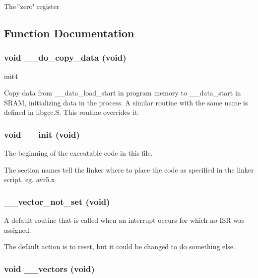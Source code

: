 The \char`\"{}zero\char`\"{} register 

\subsection{Function Documentation}
\subsubsection{\setlength{\rightskip}{0pt plus 5cm}void \_\-\_\-do\_\-copy\_\-data (void)}\label{crt0_8c_ab2f2df3d3b1d20c55234f883bbcb9a3}


init4 

Copy data from \_\-\_\-data\_\-load\_\-start in program memory to \_\-\_\-data\_\-start in SRAM, initializing data in the process. A similar routine with the same name is defined in libgcc.S. This routine overrides it. 
\subsubsection{\setlength{\rightskip}{0pt plus 5cm}void \_\-\_\-init (void)}\label{crt0_8c_c3d17760e0044b1a3768a6fc7fd0bec8}


The beginning of the executable code in this file. 

The section names tell the linker where to place the code as specified in the linker script. eg. avr5.x 
\subsubsection{\setlength{\rightskip}{0pt plus 5cm}\_\-\_\-vector\_\-not\_\-set (void)}\label{crt0_8c_b0ab8d7ade49fa69ba562f88ded702a4}


A default routine that is called when an interrupt occurs for which no ISR was assigned. 

The default action is to reset, but it could be changed to do something else. 
\subsubsection{\setlength{\rightskip}{0pt plus 5cm}void \_\-\_\-vectors (void)}\label{crt0_8c_2b11cbc560dbd3b845b049fbd3ceefe3}


